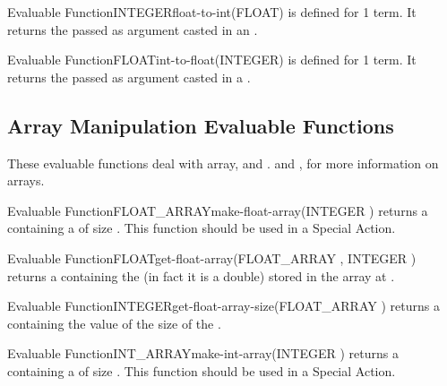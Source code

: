\begin{typeefa}{Evaluable Function}{INTEGER}{float-to-int}{({FLOAT})}
is defined for 1 term. It returns the  passed as argument casted in
an . 
\end{typeefa}

\begin{typeefa}{Evaluable Function}{FLOAT}{int-to-float}{({INTEGER})}
is defined for 1 term. It returns the  passed as argument casted
in a .
\end{typeefa}

\subsection{Array Manipulation Evaluable Functions}

These evaluable functions deal with array,  and
.  and , for more information on arrays.

\begin{typeefa}{Evaluable Function}{FLOAT\_ARRAY}{make-float-array}{(INTEGER )}
returns a  containing a  of size .
This function should be used in a Special Action.
\end{typeefa}

\begin{typeefa}{Evaluable Function}{FLOAT}{get-float-array}{(FLOAT\_ARRAY
, INTEGER )}
returns a  containing the   (in fact it is a double)
stored in the array  at  .
\end{typeefa}

\begin{typeefa}{Evaluable Function}{INTEGER}{get-float-array-size}{(FLOAT\_ARRAY
)}
returns a  containing the  value of the size of the
. 
\end{typeefa}

\begin{typeefa}{Evaluable Function}{INT\_ARRAY}{make-int-array}{(INTEGER )}
returns a  containing a  of size .
This function should be used in a Special Action.
\end{typeefa}

